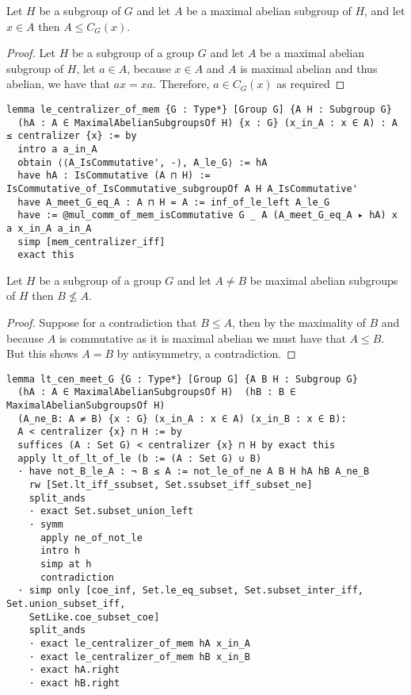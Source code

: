 \begin{lemma}
\label{MaximalAbelianSubgroup.le_centralizer_of_mem}
\leanok
Let $H$ be a subgroup of $G$ and let $A$ be a maximal abelian subgroup of $H$, and let $x \in A$ then $A \le C_G(x)$.
\end{lemma}
\begin{proof}
  \leanok
  Let $H$ be a subgroup of a group $G$ and let $A$ be a maximal abelian subgroup of $H$, let $a \in A$,
  because $x \in A$ and $A$ is maximal abelian and thus abelian, we have that $a x = x a$. 
  Therefore, $a \in C_G(x)$ as required
\end{proof}
\begin{footnotesize}
\begin{verbatim}
lemma le_centralizer_of_mem {G : Type*} [Group G] {A H : Subgroup G}
  (hA : A ∈ MaximalAbelianSubgroupsOf H) {x : G} (x_in_A : x ∈ A) : A ≤ centralizer {x} := by
  intro a a_in_A
  obtain ⟨⟨A_IsCommutative', -⟩, A_le_G⟩ := hA
  have hA : IsCommutative (A ⊓ H) := IsCommutative_of_IsCommutative_subgroupOf A H A_IsCommutative'
  have A_meet_G_eq_A : A ⊓ H = A := inf_of_le_left A_le_G
  have := @mul_comm_of_mem_isCommutative G _ A (A_meet_G_eq_A ▸ hA) x a x_in_A a_in_A
  simp [mem_centralizer_iff]
  exact this
\end{verbatim}
\end{footnotesize}

\begin{lemma}
  \label{MaximalAbelianSubgroup.not_le_of_ne}
  \leanok
  Let $H$ be a subgroup of a group $G$ and let $A \ne B$ be maximal abelian subgroups of $H$ then $B \not\le A$.
\end{lemma}
\begin{proof}
  \leanok
Suppose for a contradiction that $B \le A$, then by the maximality of $B$ and because $A$ is commutative as it is maximal abelian we must have that $A \le B$.
But this shows $A = B$ by antisymmetry, a contradiction.
\end{proof}
\begin{footnotesize}
\begin{verbatim}
lemma lt_cen_meet_G {G : Type*} [Group G] {A B H : Subgroup G}
  (hA : A ∈ MaximalAbelianSubgroupsOf H)  (hB : B ∈ MaximalAbelianSubgroupsOf H)
  (A_ne_B: A ≠ B) {x : G} (x_in_A : x ∈ A) (x_in_B : x ∈ B):
  A < centralizer {x} ⊓ H := by
  suffices (A : Set G) < centralizer {x} ⊓ H by exact this
  apply lt_of_lt_of_le (b := (A : Set G) ∪ B)
  · have not_B_le_A : ¬ B ≤ A := not_le_of_ne A B H hA hB A_ne_B
    rw [Set.lt_iff_ssubset, Set.ssubset_iff_subset_ne]
    split_ands
    · exact Set.subset_union_left
    · symm
      apply ne_of_not_le
      intro h
      simp at h
      contradiction
  · simp only [coe_inf, Set.le_eq_subset, Set.subset_inter_iff, Set.union_subset_iff,
    SetLike.coe_subset_coe]
    split_ands
    · exact le_centralizer_of_mem hA x_in_A
    · exact le_centralizer_of_mem hB x_in_B
    · exact hA.right
    · exact hB.right
\end{verbatim}
\end{footnotesize}

